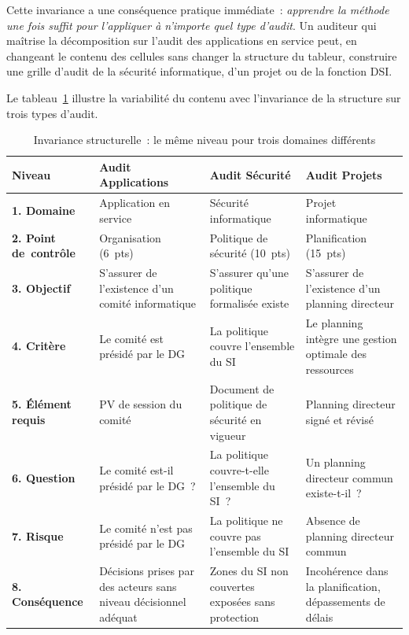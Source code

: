 Cette invariance a une conséquence pratique immédiate~: \emph{apprendre la
méthode une fois suffit pour l'appliquer à n'importe quel type d'audit}. Un
auditeur qui maîtrise la décomposition sur l'audit des applications en service
peut, en changeant le contenu des cellules sans changer la structure du tableur,
construire une grille d'audit de la sécurité informatique, d'un projet ou de la
fonction DSI.

Le tableau~\ref{tab:types-niveaux} illustre la variabilité du contenu avec
l'invariance de la structure sur trois types d'audit.

\begin{table}[H]
\centering
\small
\caption{Invariance structurelle~: le même niveau pour trois domaines différents}
\label{tab:types-niveaux}
\begin{tabular}{p{2.6cm}p{3.5cm}p{3.5cm}p{3.5cm}}
\toprule
\textbf{Niveau} &
\textbf{Audit Applications} &
\textbf{Audit Sécurité} &
\textbf{Audit Projets} \\
\midrule
\textbf{1. Domaine} &
Application en service &
Sécurité informatique &
Projet informatique \\
\addlinespace
\textbf{2. Point de~contrôle} &
Organisation (6~pts) &
Politique de sécurité (10~pts) &
Planification (15~pts) \\
\addlinespace
\textbf{3. Objectif} &
S'assurer de l'existence d'un comité informatique &
S'assurer qu'une politique formalisée existe &
S'assurer de l'existence d'un planning directeur \\
\addlinespace
\textbf{4. Critère} &
Le comité est présidé par le DG &
La politique couvre l'ensemble du SI &
Le planning intègre une gestion optimale des ressources \\
\addlinespace
\textbf{5. Élément requis} &
PV de session du comité &
Document de politique de sécurité en vigueur &
Planning directeur signé et révisé \\
\addlinespace
\textbf{6. Question} &
Le comité est-il présidé par le DG~? &
La politique couvre-t-elle l'ensemble du SI~? &
Un planning directeur commun existe-t-il~? \\
\addlinespace
\textbf{7. Risque} &
Le comité n'est pas présidé par le DG &
La politique ne couvre pas l'ensemble du SI &
Absence de planning directeur commun \\
\addlinespace
\textbf{8. Conséquence} &
Décisions prises par des acteurs sans niveau décisionnel adéquat &
Zones du SI non couvertes exposées sans protection &
Incohérence dans la planification, dépassements de délais \\
\bottomrule
\end{tabular}
\end{table}

